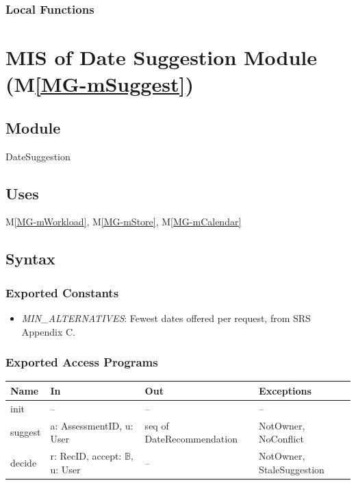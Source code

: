 \documentclass[12pt, titlepage]{article}
\newcommand{\mref}[1]{M\ref{MG-#1}}
\begin{document}
\subsubsection{Local Functions}

\newpage

\section{MIS of Date Suggestion Module (\mref{mSuggest})} \label{mis-mSuggest}

\subsection{Module}
DateSuggestion

\subsection{Uses}
\mref{mWorkload}, \mref{mStore}, \mref{mCalendar}

\subsection{Syntax}

\subsubsection{Exported Constants}
\begin{itemize}
\item \textit{MIN\_ALTERNATIVES}: Fewest dates offered per request, from SRS Appendix C.
\end{itemize}

\subsubsection{Exported Access Programs}
\begin{center}\small
\begin{tabular}{>{\raggedright\arraybackslash}p{3.3cm} >{\raggedright\arraybackslash}p{4.1cm} >{\raggedright\arraybackslash}p{3.4cm} >{\raggedright\arraybackslash}p{4.0cm}}
\hline
\textbf{Name} & \textbf{In} & \textbf{Out} & \textbf{Exceptions} \\
\hline
init & -- & -- & -- \\
suggest & a: AssessmentID, u: User & seq of DateRecommendation & NotOwner, NoConflict \\
decide & r: RecID, accept: $\mathbb{B}$, u: User & -- & NotOwner, StaleSuggestion \\
\hline
\end{tabular}
\end{center}
\end{document}

